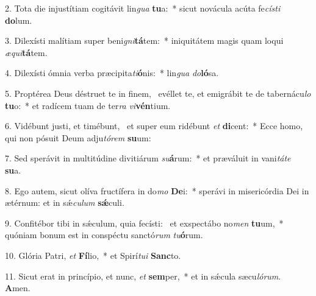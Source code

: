 2. Tota die injustítiam cogitávit lin\textit{gua} \textbf{tu}a:~*  sicut novácula acúta fe\textit{cís}\textit{ti} \textbf{do}lum.\

3. Dilexísti malítiam super beni\textit{gni}\textbf{tá}tem:~*  iniquitátem magis quam loqui \textit{æ}\textit{qui}\textbf{tá}tem.\

4. Dilexísti ómnia verba præcipita\textit{ti}\textbf{ó}nis:~*  lin\textit{gua} \textit{do}\textbf{ló}sa.\

5. Proptérea Deus déstruet te in finem, \dag\  evéllet te, et emigrábit te de tabernácu\textit{lo} \textbf{tu}o:~*  et radícem tuam de ter\textit{ra} \textit{vi}\textbf{vén}tium.\

6. Vidébunt justi, et timébunt, \dag\  et super eum ridébunt \textit{et} \textbf{di}cent:~*  Ecce homo, qui non pósuit Deum adju\textit{tó}\textit{rem} \textbf{su}um:\

7. Sed sperávit in multitúdine divitiárum \textit{su}\textbf{á}rum:~*  et præváluit in vani\textit{tá}\textit{te} \textbf{su}a.\

8. Ego autem, sicut olíva fructífera in do\textit{mo} \textbf{De}i:~*  sperávi in misericórdia Dei in ætérnum: et in sǽ\textit{cu}\textit{lum} \textbf{sǽ}culi.\

9. Confitébor tibi in sǽculum, quia fecísti: \dag\  et exspectábo no\textit{men} \textbf{tu}um,~*  quóniam bonum est in conspéctu sanctó\textit{rum} \textit{tu}\textbf{ó}rum.\

10. Glória Patri, \textit{et} \textbf{Fí}lio,~*  et Spirí\textit{tu}\textit{i} \textbf{Sanc}to.\

11. Sicut erat in princípio, et nunc, \textit{et} \textbf{sem}per,~*  et in sǽcula sæcu\textit{ló}\textit{rum}. \textbf{A}men.\

